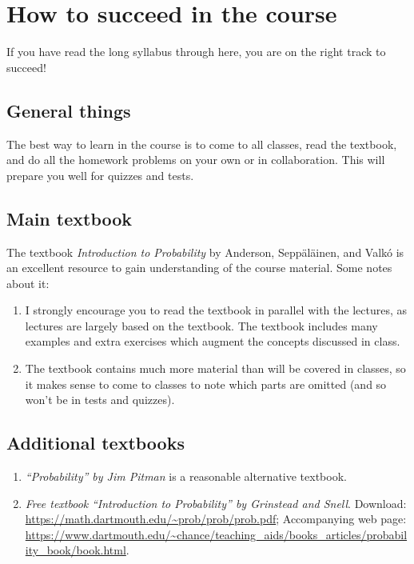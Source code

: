 \documentclass[oneside,11pt]{amsart}
\begin{document}
\section{How to succeed in the course}
\label{success}

If you have read the long syllabus through here, you are on the right
track to succeed!

\subsection{General things}

The best way to learn in the course is to 
come to all classes, read the textbook,
and do all the homework problems on your own or in collaboration.
This will prepare you well for quizzes and tests.

\subsection{Main textbook}

The textbook \emph{Introduction to Probability} by Anderson, Sepp\"al\"ainen, and Valk\'o 
is 
an excellent resource 
to gain understanding of the course material. Some notes about it:

\begin{enumerate}[$\bullet$]
	\item I strongly encourage you to read the textbook in parallel with 
		the lectures, as lectures are largely based on the textbook.
		The textbook includes many examples and
		extra exercises which augment the concepts discussed in class.
	\item The textbook contains much more material than will be covered in classes, so it
		makes sense to come to classes to note which parts are omitted
		(and so won't be in tests and quizzes).
\end{enumerate}

\subsection{Additional textbooks}

\begin{enumerate}
	\item 
		\emph{``Probability'' by Jim Pitman} is a reasonable alternative textbook.
	\item 
		\emph{Free textbook} 
		\emph{``Introduction to Probability'' by Grinstead and Snell}.
			Download: \url{https://math.dartmouth.edu/~prob/prob/prob.pdf};
			Accompanying web page: \url{https://www.dartmouth.edu/~chance/teaching_aids/books_articles/probability_book/book.html}.
\end{enumerate}
\end{document}
